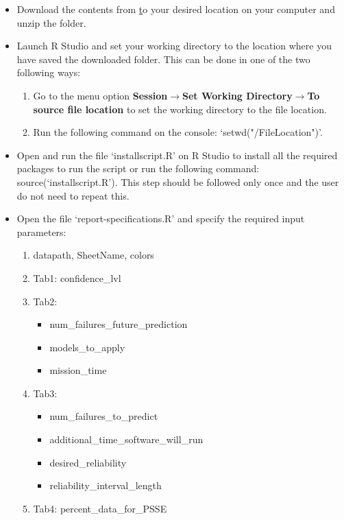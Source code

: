 \documentclass[journal]{IEEEtran}
\begin{document}
\begin{itemize}
  \item {Download the contents from \href{https://github.com/vnagaraju14/SFRAT_Automated-Report-Generation} to your desired location on your computer and unzip the folder.}
  \item {Launch R Studio and set your working directory to the location where you have saved the downloaded folder. This can be done in one of the two following ways:
  \begin{enumerate}
    \item {Go to the menu option \textbf{Session}$\to$\textbf{Set Working Directory}$\to$\textbf{To source file location} to set the working directory to the file location.}
    \item {Run the following command on the console: `setwd("/FileLocation")'.}
  \end{enumerate}
  }
  \item {Open and run the file `installscript.R' on R Studio to install all the required packages to run the script or run the following command: source(‘installscript.R’). This step should be followed only once and the user do not need to repeat this.}
  \item {Open the file `report-specifications.R’ and specify the required input parameters:
  \begin{enumerate}
    \item {datapath, SheetName, colors}
    \item {Tab1: confidence\_lvl}
    \item {Tab2:
    \begin{itemize}
      \item {num\_failures\_future\_prediction}
      \item {models\_to\_apply}
      \item {mission\_time}
    \end{itemize}
    }
    \item {Tab3:
    \begin{itemize}
      \item {num\_failures\_to\_predict}
      \item {additional\_time\_software\_will\_run}
      \item {desired\_reliability}
      \item {reliability\_interval\_length}
    \end{itemize}
    }
    \item {Tab4: percent\_data\_for\_PSSE}
  \end{enumerate}
}
\end{itemize}
\end{document}
